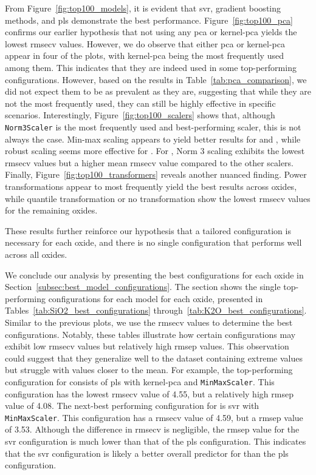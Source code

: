 From Figure~\ref{fig:top100_models}, it is evident that \gls{svr}, gradient boosting methods, and \gls{pls} demonstrate the best performance.
Figure~\ref{fig:top100_pca} confirms our earlier hypothesis that not using any \gls{pca} or \gls{kernel-pca} yields the lowest \gls{rmsecv} values.
However, we do observe that either \gls{pca} or \gls{kernel-pca} appear in four of the plots, with \gls{kernel-pca} being the most frequently used among them.
This indicates that they are indeed used in some top-performing configurations. 
However, based on the results in Table~\ref{tab:pca_comparison}, we did not expect them to be as prevalent as they are, suggesting that while they are not the most frequently used, they can still be highly effective in specific scenarios.
Interestingly, Figure~\ref{fig:top100_scalers} shows that, although \texttt{Norm3Scaler} is the most frequently used and best-performing scaler, this is not always the case.
Min-max scaling appears to yield better results for  and , while robust scaling seems more effective for .
For , Norm 3 scaling exhibits the lowest \gls{rmsecv} values but a higher mean \gls{rmsecv} value compared to the other scalers.
Finally, Figure~\ref{fig:top100_transformers} reveals another nuanced finding.
Power transformations appear to most frequently yield the best results across oxides, while quantile transformation or no transformation show the lowest \gls{rmsecv} values for the remaining oxides.

These results further reinforce our hypothesis that a tailored configuration is necessary for each oxide, and there is no single configuration that performs well across all oxides.



We conclude our analysis by presenting the best configurations for each oxide in Section~\ref{subsec:best_model_configurations}.
The section shows the single top-performing configurations for each model for each oxide, presented in Tables~\ref{tab:SiO2_best_configurations} through~\ref{tab:K2O_best_configurations}.
Similar to the previous plots, we use the \gls{rmsecv} values to determine the best configurations.
Notably, these tables illustrate how certain configurations may exhibit low \gls{rmsecv} values but relatively high \gls{rmsep} values.
This observation could suggest that they generalize well to the dataset containing extreme values but struggle with values closer to the mean.
For example, the top-performing configuration for  consists of \gls{pls} with \gls{kernel-pca} and \texttt{MinMaxScaler}.
This configuration has the lowest \gls{rmsecv} value of 4.55, but a relatively high \gls{rmsep} value of 4.08.
The next-best performing configuration for  is \gls{svr} with \texttt{MinMaxScaler}.
This configuration has a \gls{rmsecv} value of 4.59, but a \gls{rmsep} value of 3.53.
Although the difference in \gls{rmsecv} is negligible, the \gls{rmsep} value for the \gls{svr} configuration is much lower than that of the \gls{pls} configuration.
This indicates that the \gls{svr} configuration is likely a better overall predictor for  than the \gls{pls} configuration.

